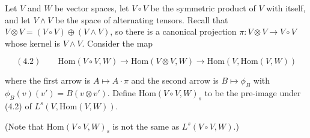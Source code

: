 Let $V$ and $W$ be vector spaces, let $V \circ V$ be the symmetric product of $V$ with itself, and let $V \wedge V$ be the space of alternating tensors. Recall that $V \otimes V = (V \circ V) \oplus (V \wedge V)$, so there is a canonical projection $\pi : V \otimes V \to V \circ V$ whose kernel is $V \wedge V$. Consider the map

$$(4.2) \qquad \text{Hom}(V \circ V, W) \to \text{Hom}(V \otimes V, W) \to \text{Hom}(V, \text{Hom}(V, W))$$

where the first arrow is $A \mapsto A \cdot \pi$ and the second arrow is $B \mapsto \phi_B$ with $\phi_B(v)(v') = B(v \otimes v')$. Define $\text{Hom}(V \circ V, W)_s$ to be the pre-image under (4.2) of $L^s(V, \text{Hom}(V, W))$.

(Note that $\text{Hom}(V \circ V, W)_s$ is not the same as $L^s(V \circ V, W)$.)
